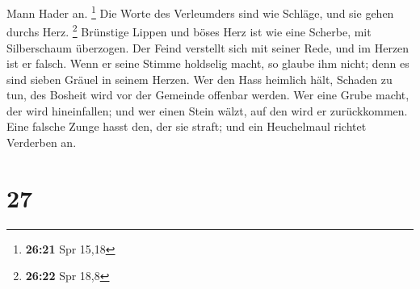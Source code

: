 Mann Hader an. \footnote{\textbf{26:21} Spr 15,18}  Die
Worte des Verleumders sind wie Schläge, und sie gehen durchs Herz.
\footnote{\textbf{26:22} Spr 18,8}  Brünstige Lippen und
böses Herz ist wie eine Scherbe, mit Silberschaum überzogen.
 Der Feind verstellt sich mit seiner Rede, und im Herzen
ist er falsch.  Wenn er seine Stimme holdselig macht, so
glaube ihm nicht; denn es sind sieben Gräuel in seinem Herzen.
 Wer den Hass heimlich hält, Schaden zu tun, des Bosheit
wird vor der Gemeinde offenbar werden.  Wer eine Grube
macht, der wird hineinfallen; und wer einen Stein wälzt, auf den wird er
zurückkommen.  Eine falsche Zunge hasst den, der sie
straft; und ein Heuchelmaul richtet Verderben an.

\hypertarget{section-26}{%
\section{27}\label{section-26}}

